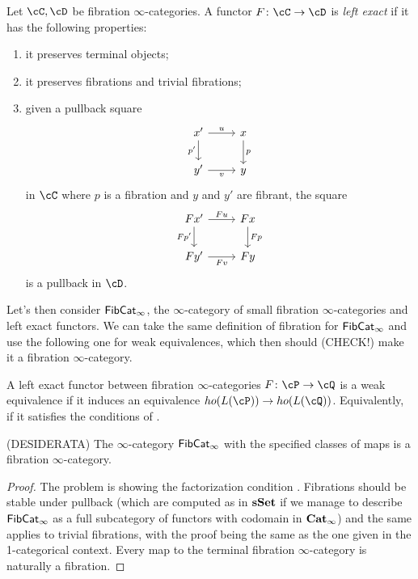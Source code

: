 \documentclass[a4paper,12pt,openany]{scrartcl}
\begin{document}
\begin{defn}
  Let $\cC,\cD$ be fibration $\infty$-categories. A functor
  $F\colon\cC\rightarrow\cD$ is \emph{left exact} if it has the following
  properties:
  \begin{enumerate}
    \item it preserves terminal objects;
    \item it preserves fibrations and trivial fibrations;
    \item given a pullback square
      \[\begin{tikzcd}
        {x'} & x \\
        {y'} & y
        \arrow["p", from=1-2, to=2-2]
        \arrow["{p'}"', from=1-1, to=2-1]
        \arrow["v"', from=2-1, to=2-2]
        \arrow["u", from=1-1, to=1-2]
      \end{tikzcd}\]
      in $\cC$ where $p$ is a fibration and $y$ and $y'$ are fibrant, the square
      \[\begin{tikzcd}
        {Fx'} & Fx \\
        {Fy'} & Fy
        \arrow["Fp", from=1-2, to=2-2]
        \arrow["{Fp'}"', from=1-1, to=2-1]
        \arrow["Fv"', from=2-1, to=2-2]
        \arrow["Fu", from=1-1, to=1-2]
      \end{tikzcd}\]
      is a pullback in $\cD$.
  \end{enumerate}
\end{defn}

Let's then consider $\operatorname{\mathsf{FibCat}}_\infty$, the $\infty$-category of small fibration
$\infty$-categories and left exact functors. We can take the same definition of
fibration for $\operatorname{\mathsf{FibCat}}_\infty$ and use the following one for weak equivalences, which then should (CHECK!)
make it a fibration $\infty$-category.

\begin{defn}
    A left exact functor between fibration $\infty$-categories
    $F\colon\cP\rightarrow\cQ$ is a weak equivalence if it induces an
    equivalence $ho(L(\cP))\rightarrow ho(L(\cQ))$. Equivalently, if it
    satisfies the conditions of \cite[Thm. 7.6.15]{Cis19}.
\end{defn}

\begin{prop}
  (DESIDERATA) The $\infty$-category $\operatorname{\mathsf{FibCat}}_\infty$ with the specified classes
  of maps is a fibration $\infty$-category.
\end{prop}
\begin{proof}
  The problem is showing the factorization condition . Fibrations
  should be stable under pullback (which are computed as in $\operatorname{\mathbf{sSet}}$ if we manage
  to describe $\operatorname{\mathsf{FibCat}}_\infty$ as a full subcategory of functors with codomain
  in $\operatorname{\mathbf{Cat}}_\infty$) and the same applies to trivial fibrations, with the proof
  being the same as the one given in the 1-categorical context. Every map to the
  terminal fibration $\infty$-category is naturally a fibration.
\end{proof}
\end{document}
